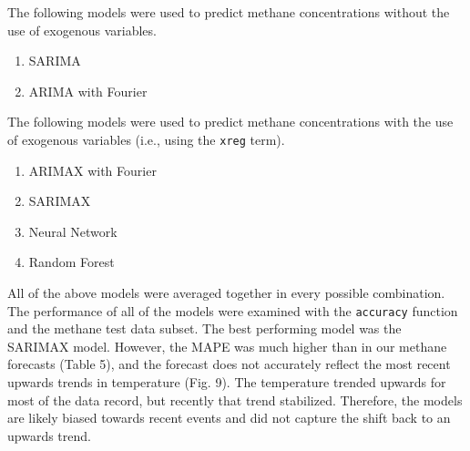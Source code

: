 \documentclass[
]{article}
\providecommand{\tightlist}{%
  \setlength{\itemsep}{0pt}\setlength{\parskip}{0pt}}
\begin{document}
The following models were used to predict methane concentrations without
the use of exogenous variables.

\begin{enumerate}
\def\labelenumi{\arabic{enumi}.}
\tightlist
\item
  SARIMA
\item
  ARIMA with Fourier
\end{enumerate}

The following models were used to predict methane concentrations with
the use of exogenous variables (i.e., using the \texttt{xreg} term).

\begin{enumerate}
\def\labelenumi{\arabic{enumi}.}
\tightlist
\item
  ARIMAX with Fourier
\item
  SARIMAX
\item
  Neural Network
\item
  Random Forest
\end{enumerate}

All of the above models were averaged together in every possible
combination. The performance of all of the models were examined with the
\texttt{accuracy} function and the methane test data subset. The best
performing model was the SARIMAX model. However, the MAPE was much
higher than in our methane forecasts (Table 5), and the forecast does
not accurately reflect the most recent upwards trends in temperature
(Fig. 9). The temperature trended upwards for most of the data record,
but recently that trend stabilized. Therefore, the models are likely
biased towards recent events and did not capture the shift back to an
upwards trend.
\end{document}
